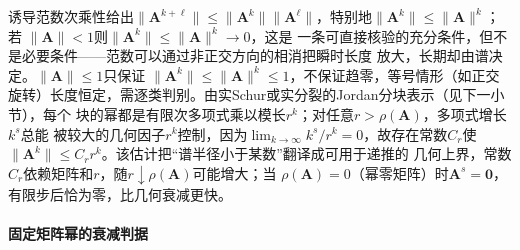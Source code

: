 诱导范数次乘性给出$\lVert\bm A^{k+\ell}\rVert\leq\lVert\bm A^k\rVert
\lVert\bm A^\ell\rVert$，特别地$\lVert\bm A^k\rVert\leq\lVert\bm A\rVert^k$；若
$\lVert\bm A\rVert<1$则$\lVert\bm A^k\rVert\leq\lVert\bm A\rVert^k\to0$，这是
一条可直接核验的充分条件，但不是必要条件——范数可以通过非正交方向的相消把瞬时长度
放大，长期却由谱决定。$\lVert\bm A\rVert\leq1$只保证
$\lVert\bm A^k\rVert\leq\lVert\bm A\rVert^k\leq1$，不保证趋零，等号情形（如正交
旋转）长度恒定，需逐类判别。由实Schur或实分裂的Jordan分块表示（见下一小节），每个
块的幂都是有限次多项式乘以模长$r^k$；对任意$r>\rho(\bm A)$，多项式增长$k^s$总能
被较大的几何因子$r^k$控制，因为$\lim_{k\to\infty}k^s/r^k=0$，故存在常数$C_r$使
$\lVert\bm A^k\rVert\leq C_r r^k$。该估计把“谱半径小于某数”翻译成可用于递推的
几何上界，常数$C_r$依赖矩阵和$r$，随$r\downarrow\rho(\bm A)$可能增大；当
$\rho(\bm A)=0$（幂零矩阵）时$\bm A^s=\bm0$，有限步后恰为零，比几何衰减更快。

\paragraph{固定矩阵幂的衰减判据}

